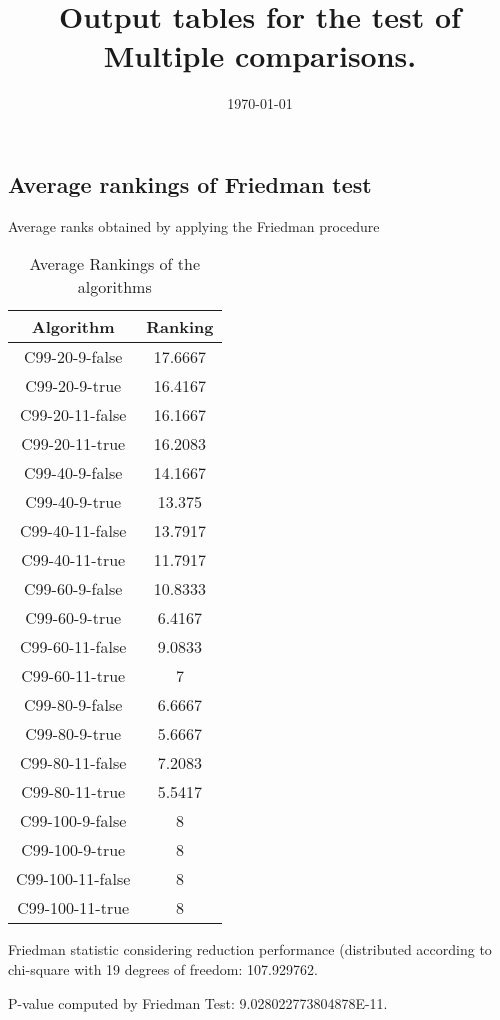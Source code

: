 \documentclass[a4paper,10pt]{article}
\title{Output tables for the test of Multiple comparisons.}
\author{}
\date{\today}
\begin{document}
\begin{landscape}
\pagestyle{empty}
\maketitle
\thispagestyle{empty}
\section{Average rankings of Friedman test}



Average ranks obtained by applying the Friedman procedure

\begin{table}[!htp]
\centering
\begin{tabular}{|c|c|}\hline
Algorithm&Ranking\\\hline
C99-20-9-false & 17.6667\\
C99-20-9-true & 16.4167\\
C99-20-11-false & 16.1667\\
C99-20-11-true & 16.2083\\
C99-40-9-false & 14.1667\\
C99-40-9-true & 13.375\\
C99-40-11-false & 13.7917\\
C99-40-11-true & 11.7917\\
C99-60-9-false & 10.8333\\
C99-60-9-true & 6.4167\\
C99-60-11-false & 9.0833\\
C99-60-11-true & 7\\
C99-80-9-false & 6.6667\\
C99-80-9-true & 5.6667\\
C99-80-11-false & 7.2083\\
C99-80-11-true & 5.5417\\
C99-100-9-false & 8\\
C99-100-9-true & 8\\
C99-100-11-false & 8\\
C99-100-11-true & 8\\
\hline
\end{tabular}
\caption{Average Rankings of the algorithms}
\end{table}

Friedman statistic considering reduction performance (distributed according to chi-square with 19 degrees of freedom: 107.929762.

P-value computed by Friedman Test: 9.028022773804878E-11.\newline




\end{landscape}
\end{document}
